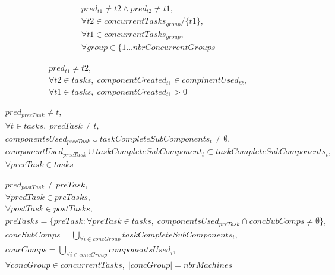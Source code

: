 \documentclass[10pt,a4paper]{report}
\begin{document}

\begin{align*}
&pred_{t1} \neq t2 \land pred_{t2} \neq t1,\\
&\forall t2 \in concurrentTasks_{group} / \{t1\},\\
&\forall t1 \in concurrentTasks_{group},\\
&\forall group \in \{1 \ldots nbrConcurrentGroups
\end{align*}

\begin{align*}
&pred_{t1} \neq t2,\\
&\forall t2 \in tasks, \; componentCreated_{t1} \in compinentUsed_{t2},\\
&\forall t1 \in tasks, \; componentCreated_{t1} > 0
\end{align*}

\begin{align*}
&pred_{precTask} \neq t,\\
&\forall t \in tasks, \; precTask \neq t,\\
&componentsUsed_{precTask} \cup taskCompleteSubComponents_t \neq \emptyset,\\
&componentUsed_{precTask} \cup taskCompleteSubComponent_t \subset taskCompleteSubComponents_t,\\
&\forall precTask \in tasks
\end{align*}

\begin{align*}
&pred_{postTask} \neq preTask,\\
&\forall predTask \in preTasks,\\
&\forall postTask \in postTasks,\\
&preTasks = \{preTask : \forall preTask \in tasks, \; componentsUsed_{preTask} \cap concSubComps \neq \emptyset\},\\
&concSubComps = \bigcup_{\forall i \in concGroup}taskCompleteSubComponents_i,\\
&concComps = \bigcup_{\forall i \in concGroup}componentsUsed_i,\\
&\forall concGroup \in concurrentTasks, \; |concGroup| = nbrMachines
\end{align*}
\end{document}
